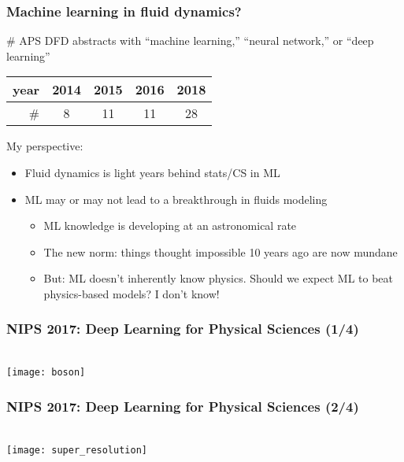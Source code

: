 \begin{frame}
    \frametitle{Machine learning in fluid dynamics?}
    \# APS DFD abstracts with ``machine learning,'' ``neural network,'' or ``deep learning''

    \begin{center}
        \begin{tabular}{r|cccc}
            year & 2014 & 2015 & 2016 & 2018 \\
            \hline
            \# & 8 & 11 & 11 & \alert{28}
        \end{tabular}
    \end{center}
    \pause

    My perspective:

    \begin{itemize}
        \item Fluid dynamics is light years behind stats/CS in ML
        \item ML may or may not lead to a breakthrough in fluids modeling
        \begin{itemize}
            \item ML knowledge is developing at an astronomical rate
            \item The new norm: things thought impossible 10 years ago are now mundane
            \item But: ML doesn't inherently know physics.
            Should we expect ML to beat physics-based models?
            I don't know!
        \end{itemize}
    \end{itemize}
\end{frame}

\begin{frame}
    \frametitle{NIPS 2017: Deep Learning for Physical Sciences (1/4)}
     \citep{HenrionNIPS17} \\[1ex]

    \centering
    \texttt{[image: boson]}
\end{frame}

\begin{frame}
    \frametitle{NIPS 2017: Deep Learning for Physical Sciences (2/4)}
     \citep{WellingNIPS17} \\[1ex]

    \centering
    \texttt{[image: super\_resolution]}
\end{frame}


